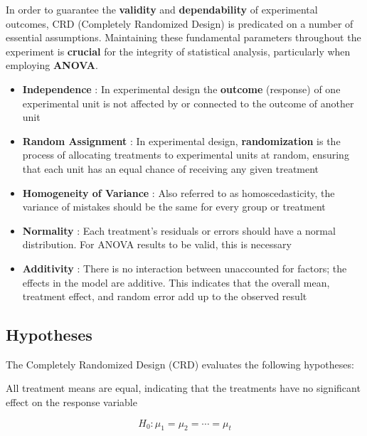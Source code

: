 \documentclass[
  letterpaper,
  DIV=11,
  numbers=noendperiod]{scrartcl}
\begin{document}
In order to guarantee the \textbf{validity} and \textbf{dependability}
of experimental outcomes, CRD (Completely Randomized Design) is
predicated on a number of essential assumptions. Maintaining these
fundamental parameters throughout the experiment is \textbf{crucial} for
the integrity of statistical analysis, particularly when employing
\textbf{ANOVA}.

\begin{itemize}
\item
  \textbf{Independence} : In experimental design the \textbf{outcome}
  (response) of one experimental unit is not affected by or connected to
  the outcome of another unit
\item
  \textbf{Random Assignment} : In experimental design,
  \textbf{randomization} is the process of allocating treatments to
  experimental units at random, ensuring that each unit has an equal
  chance of receiving any given treatment
\item
  \textbf{Homogeneity of Variance} : Also referred to as
  homoscedasticity, the variance of mistakes should be the same for
  every group or treatment
\item
  \textbf{Normality} : Each treatment's residuals or errors should have
  a normal distribution. For ANOVA results to be valid, this is
  necessary
\item
  \textbf{Additivity} : There is no interaction between unaccounted for
  factors; the effects in the model are additive. This indicates that
  the overall mean, treatment effect, and random error add up to the
  observed result
\end{itemize}

\hypertarget{sec-hypotheses}{%
\subsection{Hypotheses}\label{sec-hypotheses}}

The Completely Randomized Design (CRD) evaluates the following
hypotheses:

\begin{tcolorbox}[enhanced jigsaw, titlerule=0mm, title=\textcolor{quarto-callout-important-color}{\faExclamation}\hspace{0.5em}{Null Hypothesis (H₀)}, bottomrule=.15mm, colback=white, opacityback=0, rightrule=.15mm, colframe=quarto-callout-important-color-frame, toprule=.15mm, toptitle=1mm, leftrule=.75mm, left=2mm, arc=.35mm, breakable, coltitle=black, bottomtitle=1mm, colbacktitle=quarto-callout-important-color!10!white, opacitybacktitle=0.6]

All treatment means are equal, indicating that the treatments have no
significant effect on the response variable

\[H_0 : \mu_1 = \mu_2 = \cdots = \mu_t\]

\end{tcolorbox}
\end{document}
